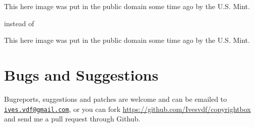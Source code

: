 \documentclass[pagesize=auto]{scrartcl}
\newcommand*{\mail}[1]{\href{mailto:#1}{\texttt{#1}}}
\begin{document}
\makeatother
\begin{center}
      {This here image was put in the public domain some time ago by the U.S. Mint.}
\end{center}

instead of 

\makeatletter
\renewcommand{\CRB@setcopyrightparagraphstyle}{%
\raggedright
}

\makeatother
\begin{center}
      {This here image was put in the public domain some time ago by the U.S. Mint.}
\end{center}

\section{Bugs and Suggestions}
Bugreports, suggestions and patches are welcome and can be emailed to
\mail{ives.vdf@gmail.com}, or you can fork
\url{https://github.com/Ivesvdf/copyrightbox} and send me a pull request
through Github. 
\end{document}
